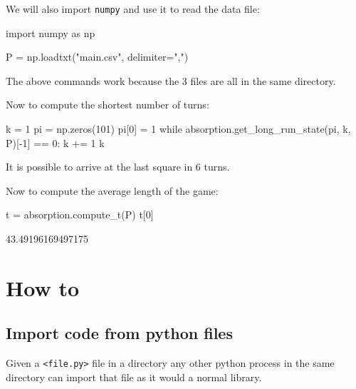 We will also import \texttt{numpy} and use it to read the data file:




\begin{pyin}
import numpy as np

P = np.loadtxt("main.csv", delimiter=",")
\end{pyin}

\begin{note}
The above commands work because the 3 files are all in the same directory.
\end{note}



Now to compute the shortest number of turns:




\begin{pyin}
k = 1
pi = np.zeros(101)
pi[0] = 1
while absorption.get_long_run_state(pi, k, P)[-1] == 0:
    k += 1
k
\end{pyin}





It is possible to arrive at the last square in 6 turns.


Now to compute the average length of the game:





\begin{pyin}
t = absorption.compute_t(P)
t[0]
\end{pyin}



\begin{raw}
43.49196169497175
\end{raw}




\section{How to}
\label{\detokenize{building-tools/05-modularisation/how/main:how}}\label{\detokenize{building-tools/05-modularisation/how/main::doc}}

\subsection{Import code from python files}
\label{\detokenize{building-tools/05-modularisation/how/main:how-to-import-code-from-python-files}}

Given a \texttt{<file.py>} file in a directory any other python process in the
same directory can import that file as it would a normal library.



